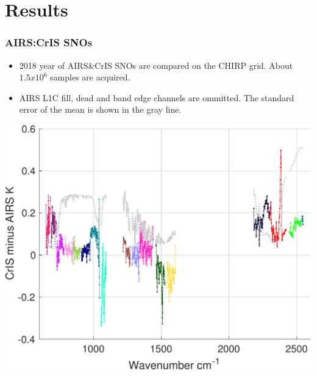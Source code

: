 \documentclass[10pt,t]{beamer}
\begin{document}
\section{Results}
\begin{frame}
  \frametitle{AIRS:CrIS SNOs}
  \begin{itemize}
  \item 2018 year of AIRS\&CrIS SNOs are compared on the CHIRP grid. About $1.5 x 10^6$ samples are acquired.
    \item AIRS L1C fill, dead and band edge channels are ommitted. The standard error of the mean is shown in the gray line.
  \end{itemize}

  \begin{center}
    \includegraphics[width=0.66\linewidth]{./Figs/Pdf/ac_sno_2018_bias_stderr_coloraslp.pdf}
  \end{center}

\end{frame}
\end{document}
